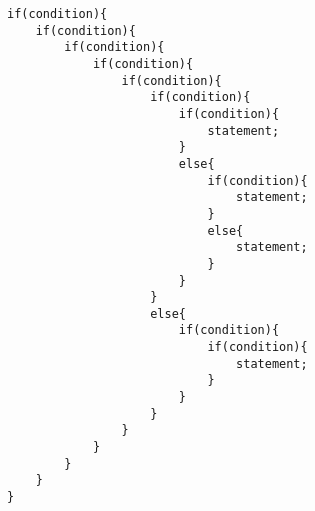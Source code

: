 \documentclass[11pt]{article}
\begin{document}
\lstset{language=C, breaklines=true, basicstyle=\footnotesize}
\begin{lstlisting}[frame=single]
if(condition){
    if(condition){
        if(condition){
            if(condition){
                if(condition){
                    if(condition){
                        if(condition){
                            statement;
                        }
                        else{
                            if(condition){
                                statement;
                            }
                            else{
                                statement;
                            }
                        }
                    }
                    else{
                        if(condition){
                            if(condition){
                                statement;
                            }
                        }
                    }
                }
            }
        }
    }
}
\end{lstlisting}
\end{document}
